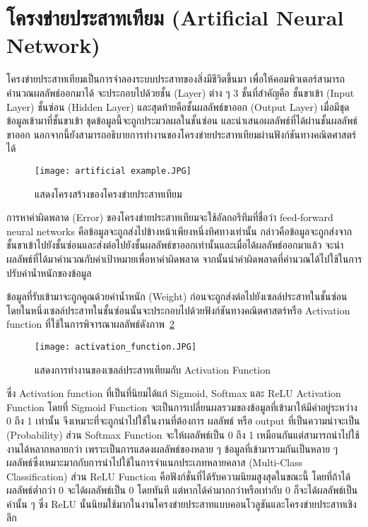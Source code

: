 \section{โครงข่ายประสาทเทียม (Artificial Neural Network)}
โครงข่ายประสาทเทียมเป็นการจำลองระบบประสาทของสิ่งมีชีวิตขึ้นมา เพื่อให้คอมพิวเตอร์สามารถคำนวณผลลัพธ์ออกมาได้ จะประกอบไปด้วยชั้น (Layer) ต่าง ๆ 3 
ชั้นที่สำคัญคือ ชั้นขาเข้า (Input Layer) ชั้นซ่อน (Hidden Layer) 
และสุดท้ายคือชั้นผลลัพธ์ขาออก (Output Layer) เมื่อมีชุดข้อมูลเข้ามาที่ชั้นขาเข้า 
ชุดข้อมูลนี้จะถูกประมวลผลในชั้นซ่อน และนำเสนอผลลัพธ์ที่ได้ผ่านชั้นผลลัพธ์ขาออก 
นอกจากนี้ยังสามารถอธิบายการทำงานของโครงข่ายประสาทเทียมผ่านฟังก์ชันทางคณิตศาสตร์ได้ \par

\begin{figure}[h]
    \centering
    \texttt{[image: artificial example.JPG]}
    \caption{แสดงโครงสร้างของโครงข่ายประสาทเทียม}
    \label{Fig:artificial_example}
\end{figure}

การหาค่าผิดพลาด (Error) ของโครงข่ายประสาทเทียมจะใช้อัลกอรึทึมที่ชื่อว่า feed-forward neural networks 
คือข้อมูลจะถูกส่งไปข้างหน้าเพียงหนึ่งทิศทางเท่านั้น 
กล่าวคือข้อมูลจะถูกส่งจากชั้นขาเข้าไปยังชั้นซ่อนและส่งต่อไปยังชั้นผลลัพธ์ขาออกเท่านั้นและเมื่อได้ผลลัพธ์ออกมาแล้ว 
จะนำผลลัพธ์ที่ได้มาคำนวณกับค่าเป้าหมายเพื่อหาค่าผิดพลาด 
จากนั้นนำค่าผิดพลาดที่คำนวณได้ไปใช้ในการปรับค่าน้ำหนักของข้อมูล \par

ข้อมูลที่รับเข้ามาจะถูกคูณด้วยค่าน้ำหนัก (Weight) ก่อนจะถูกส่งต่อไปยังเซลล์ประสาทในชั้นซ่อน 
โดยในหนึ่งเซลล์ประสาทในชั้นซ่อนนั้นจะประกอบไปด้วยฟังก์ชันทางคณิตศาสตร์หรือ Activation function 
ที่ใช้ในการพิจารณาผลลัพธ์ดังภาพ~\ref{Fig:Activation_function}

\begin{figure}[h]
    \centering
    \texttt{[image: activation\_function.JPG]}
    \caption{แสดงการทำงานของเซลล์ประสาทเทียมกับ Activation Function}
    \label{Fig:Activation_function}
\end{figure}

ซึ่ง Activation function ที่เป็นที่นิยมได้แก่ Sigmoid, Softmax และ ReLU Activation Function โดยที่ 
Sigmoid Function จะเป็นการเปลี่ยนผลรวมของข้อมูลที่เข้ามาให้มีค่าอยู่ระหว่าง 0 ถึง 1 เท่านั้น จึงเหมาะที่จะถูกนำไปใช้ในงานที่ต้องการ ผลลัพธ์ หรือ output
ที่เป็นความน่าจะเป็น (Probability) ส่วน Softmax Function จะให้ผลลัพธ์เป็น 0 ถึง 1 เหมือนกันแต่สามารถนำไปใช้งานได้หลากหลายกว่า
เพราะเป็นการแสดงผลลัพธ์ของหลาย ๆ ข้อมูลที่เข้ามารวมกันเป็นหลาย ๆ ผลลัพธ์ซึ่งเหมาะมากกับการนำไปใช้ในการจำแนกประเภทหลายคลาส (Multi-Class Classification) 
ส่วน ReLU Function คือฟังก์ชั่นที่ได้รับความนิยมสูงสุดในขณะนี้ โดยที่ถ้าได้ผลลัพธ์ต่ำกว่า 0 จะได้ผลลัพธ์เป็น 0 โดยทันที
แต่หากได้ค่ามากกว่าหรือเท่ากับ 0 ก็จะได้ผลลัพธ์เป็นค่านั้น ๆ ซึ่ง ReLU นั้นนิยมใช้มากในงานโครงข่ายประสาทแบบคอนโวลูชันและโครงข่ายประสาทเชิงลึก \par

